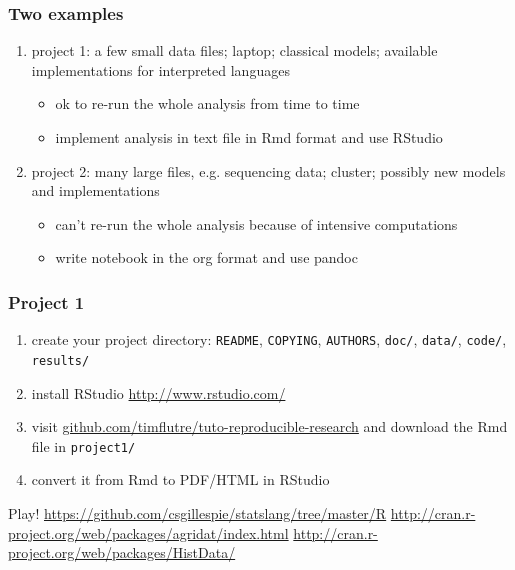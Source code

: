 \documentclass[c]{beamer} %
\begin{document}
\begin{frame}[fragile]
  \frametitle{Two examples}
  \begin{enumerate}
  \item project 1: a few small data files; laptop; classical models; available implementations for interpreted languages
    \begin{itemize}
    \item ok to re-run the whole analysis from time to time
    \item implement analysis in text file in Rmd format and use RStudio
    \end{itemize}
    \bigskip
    \pause
  \item project 2: many large files, e.g. sequencing data; cluster; possibly new models and implementations
    \begin{itemize}
    \item can't re-run the whole analysis because of intensive computations
    \item write notebook in the org format and use pandoc
    \end{itemize}
  \end{enumerate}
\end{frame}

\begin{frame}[fragile]
  \frametitle{Project 1}
  \begin{enumerate}
  \item create your project directory: \verb+README+, \verb+COPYING+, \verb+AUTHORS+, \verb+doc/+, \verb+data/+, \verb+code/+, \verb+results/+
  \item install RStudio \url{http://www.rstudio.com/}
  \item visit \href{https://github.com/timflutre/tuto-reproducible-research}{github.com/timflutre/tuto-reproducible-research} and download the Rmd file in \verb+project1/+
  \item convert it from Rmd to PDF/HTML in RStudio
  \end{enumerate}
  \bigskip
  \pause
  Play!
  \small
  \url{https://github.com/csgillespie/statslang/tree/master/R}
  \url{http://cran.r-project.org/web/packages/agridat/index.html}
  \url{http://cran.r-project.org/web/packages/HistData/}
\end{frame}
\end{document}
